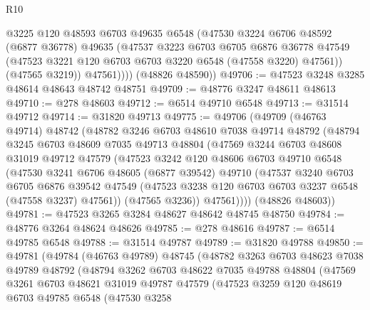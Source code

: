 \begin{lexlean}{R10}
\begin{coremodule}
              @3225
              @120
              @48593
              @6703
              @49635
              @6548
              (@47530
                @3224
                @6706
                @48592
                (@6877 @36778)
                @49635
                (@47537
                  @3223
                  @6703
                  @6705
                  @6876
                  @36778
                  @47549
                  (@47523 @3221 @120 @6703 @6703 @3220 @6548 (@47558 @3220) @47561))
                (@47565 @3219))
              @47561))))
      (@48826 @48590))
@49706 := @47523 @3248 @3285 @48614 @48643 @48742 @48751
@49709 := @48776 @3247 @48611 @48613
@49710 := @278 @48603
@49712 := @6514 @49710 @6548
@49713 := @31514 @49712
@49714 := @31820 @49713
@49775 := @49706
    (@49709
      (@46763 @49714)
      @48742
      (@48782
        @3246
        @6703
        @48610
        @7038
        @49714
        @48792
        (@48794
          @3245
          @6703
          @48609
          @7035
          @49713
          @48804
          (@47569
            @3244
            @6703
            @48608
            @31019
            @49712
            @47579
            (@47523
              @3242
              @120
              @48606
              @6703
              @49710
              @6548
              (@47530
                @3241
                @6706
                @48605
                (@6877 @39542)
                @49710
                (@47537
                  @3240
                  @6703
                  @6705
                  @6876
                  @39542
                  @47549
                  (@47523 @3238 @120 @6703 @6703 @3237 @6548 (@47558 @3237) @47561))
                (@47565 @3236))
              @47561))))
      (@48826 @48603))
@49781 := @47523 @3265 @3284 @48627 @48642 @48745 @48750
@49784 := @48776 @3264 @48624 @48626
@49785 := @278 @48616
@49787 := @6514 @49785 @6548
@49788 := @31514 @49787
@49789 := @31820 @49788
@49850 := @49781
    (@49784
      (@46763 @49789)
      @48745
      (@48782
        @3263
        @6703
        @48623
        @7038
        @49789
        @48792
        (@48794
          @3262
          @6703
          @48622
          @7035
          @49788
          @48804
          (@47569
            @3261
            @6703
            @48621
            @31019
            @49787
            @47579
            (@47523
              @3259
              @120
              @48619
              @6703
              @49785
              @6548
              (@47530
                @3258

\end{coremodule}
\end{lexlean}
